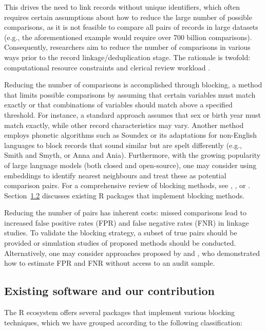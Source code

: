 This drives the need to link records without unique identifiers, which
often requires certain assumptions about how to reduce the large number
of possible comparisons, as it is not feasible to compare all pairs of
records in large datasets (e.g., the aforementioned example would
require over 700 billion comparisons). Consequently, researchers aim to
reduce the number of comparisons in various ways prior to the record
linkage/deduplication stage. The rationale is twofold: computational
resource constraints and clerical review workload \citep[cf.~][]{christen2012book}.

Reducing the number of comparisons is accomplished through blocking, a
method that limits possible comparisons by assuming that certain
variables must match exactly or that combinations of variables should
match above a specified threshold. For instance, a standard approach
assumes that sex or birth year must match exactly, while other record
characteristics may vary. Another method employs phonetic algorithms
such as Soundex \citep[cf.~][]{knuth1973} or its adaptations for non-English
languages \citep[cf.~][]{Howard2020} to block records that sound similar but are
spelt differently (e.g., Smith and Smyth, or Anna and Ania).
Furthermore, with the growing popularity of large language models (both
closed and open-source), one may consider using embeddings
\citep{mikolov2013efficient} to identify nearest neighbours and treat these
as potential comparison pairs. For a comprehensive review of blocking
methods, see \citet{Christen2012}, \citet{Steorts2014}, or \citet{Papadakis2020}. Section~\hyperref[sec-software]{1.2}
discusses existing R packages that implement blocking methods.

Reducing the number of pairs has inherent costs: missed comparisons lead
to increased false positive rates (FPR) and false negative rates (FNR)
in linkage studies. To validate the blocking strategy, a subset of true
pairs should be provided or simulation studies of proposed methods
should be conducted. Alternatively, one may consider approaches proposed
by \citet{dasylva2021estimating} and \citet{dasylva2022consistent}, who demonstrated
how to estimate FPR and FNR without access to an audit sample.

\subsection{Existing software and our contribution}\label{sec-software}

The R ecosystem offers several packages that implement various blocking
techniques, which we have grouped according to the following
classification:

